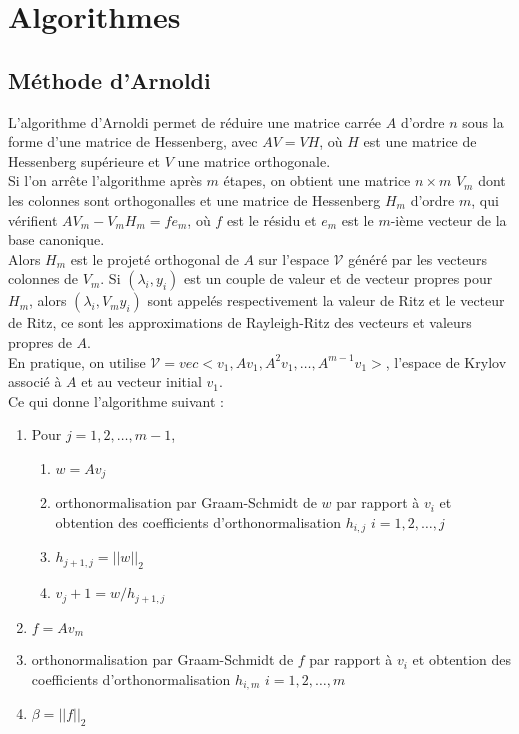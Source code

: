 \chapter{Algorithmes}

\section{Méthode d'Arnoldi}
\label{arnoldi}
L'algorithme d'Arnoldi permet de réduire une matrice carrée $A$ d'ordre $n$ sous la forme d'une matrice de Hessenberg, avec $AV = VH$, où $H$ est une matrice de Hessenberg supérieure et $V$ une matrice orthogonale.\\
Si l'on arrête l'algorithme après $m$ étapes, on obtient une matrice $n\times m$ $V_m$ dont les colonnes sont orthogonalles et une matrice de Hessenberg $H_m$ d'ordre $m$, qui vérifient $AV_m - V_mH_m = fe_m$, où $f$ est le résidu et $e_m$ est le $m$-ième vecteur de la base canonique.\\
Alors $H_m$ est le projeté orthogonal de $A$ sur l'espace $\mathcal{V}$ généré par les vecteurs colonnes de $V_m$. Si $(\lambda_i, y_i)$ est un couple de valeur et de vecteur propres pour $H_m$, alors $(\lambda_i, V_my_i)$ sont appelés respectivement la valeur de Ritz et le vecteur de Ritz, ce sont les approximations de Rayleigh-Ritz des vecteurs et valeurs propres de $A$.\\
En pratique, on utilise $\mathcal{V}= vec<v_1, Av_1, A^2v_1,\dots,A^{m-1}v_1>$, l'espace de Krylov associé à $A$ et au vecteur initial $v_1$.\\

Ce qui donne l'algorithme suivant :
\begin{enumerate}
\item Pour $j=1,2,\dots,m-1$,
\begin{enumerate}
\item $w=Av_j$
\item orthonormalisation par Graam-Schmidt de $w$ par rapport à $v_i$ et obtention des coefficients d'orthonormalisation $h_{i,j}$ $i=1,2,\dots,j$
\item $h_{j+1,j}=||w||_2$
\item $v_j+1=w/h_{j+1,j}$
\end{enumerate}
\item $f=Av_m$
\item orthonormalisation par Graam-Schmidt de $f$ par rapport à $v_i$ et obtention des coefficients d'orthonormalisation $h_{i,m}$ $i=1,2,\dots,m$
\item $\beta=||f||_2$
\end{enumerate}

